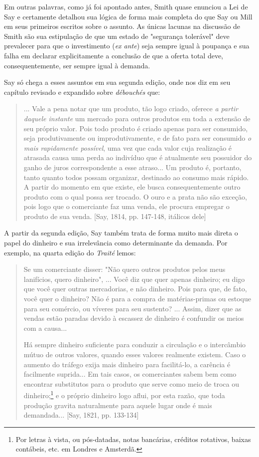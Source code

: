 \documentclass[12pt]{article}
\begin{document}
Em outras palavras, como já foi apontado antes, Smith quase enunciou a Lei de Say e certamente detalhou sua lógica de forma mais completa do que Say ou Mill em seus primeiros escritos sobre o assunto. As únicas lacunas na discussão de Smith são sua estipulação de que um estado de "segurança tolerável" deve prevalecer para que o investimento (\textit{ex ante}) seja sempre igual à poupança e sua falha em declarar explicitamente a conclusão de que a oferta total deve, consequentemente, ser sempre igual à demanda.

Say só chega a esses assuntos em sua segunda edição, onde nos diz em seu capítulo revisado e expandido sobre \textit{débouchés} que:

\begin{quote}
... Vale a pena notar que um produto, tão logo criado, oferece \textit{a partir daquele instante} um mercado para outros produtos em toda a extensão de seu próprio valor. Pois todo produto é criado apenas para ser consumido, seja produtivamente ou improdutivamente, e de fato para ser consumido \textit{o mais rapidamente possível}, uma vez que cada valor cuja realização é atrasada causa uma perda ao indivíduo que é atualmente seu possuidor do ganho de juros correspondente a esse atraso... Um produto é, portanto, tanto quanto todos possam organizar, destinado ao consumo mais rápido. A partir do momento em que existe, ele busca consequentemente outro produto com o qual possa ser trocado. O ouro e a prata não são exceção, pois logo que o comerciante faz uma venda, ele procura empregar o produto de sua venda. [Say, 1814, pp. 147-148, itálicos dele]
\end{quote}

A partir da segunda edição, Say também trata de forma muito mais direta o papel do dinheiro e sua irrelevância como determinante da demanda. Por exemplo, na quarta edição do \textit{Traité} lemos:

\begin{quote}
Se um comerciante disser: "Não quero outros produtos pelos meus lanifícios, quero dinheiro", ... Você diz que quer apenas dinheiro; eu digo que você quer outras mercadorias, e não dinheiro. Pois para que, de fato, você quer o dinheiro? Não é para a compra de matérias-primas ou estoque para seu comércio, ou víveres para seu sustento? ... Assim, dizer que as vendas estão paradas devido à escassez de dinheiro é confundir os meios com a causa...

Há sempre dinheiro suficiente para conduzir a circulação e o intercâmbio mútuo de outros valores, quando esses valores realmente existem. Caso o aumento do tráfego exija mais dinheiro para facilitá-lo, a carência é facilmente suprida... Em tais casos, os comerciantes sabem bem como encontrar substitutos para o produto que serve como meio de troca ou dinheiro;\footnote{Por letras à vista, ou pós-datadas, notas bancárias, créditos rotativos, baixas contábeis, etc. em Londres e Amsterdã.} e o próprio dinheiro logo aflui, por esta razão, que toda produção gravita naturalmente para aquele lugar onde é mais demandada... [Say, 1821, pp. 133-134]
\end{quote}
\end{document}
